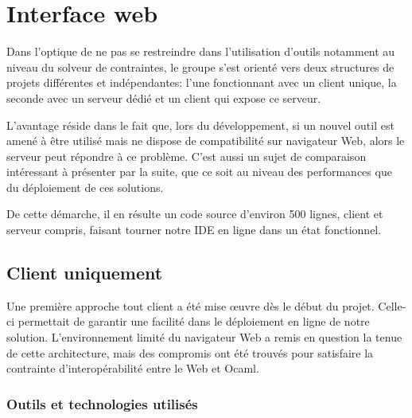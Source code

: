 \documentclass[12pt]{article}
\begin{document}
\newpage

\hypertarget{interface-web}{%
  \section{Interface web}\label{interface-web}}

Dans l'optique de ne pas se restreindre dans l'utilisation d'outils
notamment au niveau du solveur de contraintes, le groupe s'est orienté
vers deux structures de projets différentes et indépendantes: l'une
fonctionnant avec un client unique, la seconde avec un serveur dédié et
un client qui expose ce serveur.

L'avantage réside dans le fait que, lors du développement, si un nouvel
outil est amené à être utilisé mais ne dispose de compatibilité sur
navigateur Web, alors le serveur peut répondre à ce problème. C'est
aussi un sujet de comparaison intéressant à présenter par la suite, que
ce soit au niveau des performances que du déploiement de ces solutions.

De cette démarche, il en résulte un code source d'environ 500 lignes,
client et serveur compris, faisant tourner notre IDE en ligne dans un
état fonctionnel.

\hypertarget{client-uniquement}{%
  \subsection{Client uniquement}\label{client-uniquement}}

Une première approche tout client a été mise œuvre dès le début du
projet. Celle-ci permettait de garantir une facilité dans le déploiement
en ligne de notre solution. L'environnement limité du navigateur Web a
remis en question la tenue de cette architecture, mais des compromis ont
été trouvés pour satisfaire la contrainte d'interopérabilité entre le
Web et Ocaml.

\hypertarget{outils-et-technologies-utilisuxe9s}{%
  \subsubsection{Outils et technologies
    utilisés}\label{outils-et-technologies-utilisuxe9s}}
\end{document}
